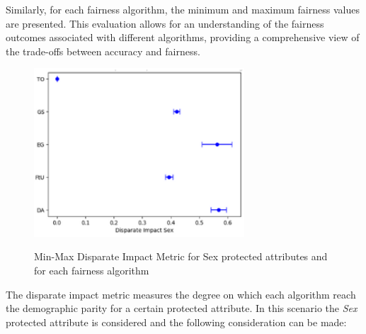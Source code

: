 Similarly, for each fairness algorithm, the minimum and maximum fairness values are presented. This evaluation allows for an understanding of the fairness outcomes associated with different algorithms, providing a comprehensive view of the trade-offs between accuracy and fairness.
\begin{figure}[H]
    \centering
    \includegraphics[width=0.7\textwidth, height=0.7\textwidth]{dis.png}
    \label{fig:dis}
    \caption{Min-Max Disparate Impact Metric for Sex protected attributes and for each fairness algorithm}
\end{figure}

The disparate impact metric measures the degree on which each algorithm reach the demographic parity for a certain protected attribute. In this scenario the \emph{Sex} protected attribute is considered and the following consideration can be made:

